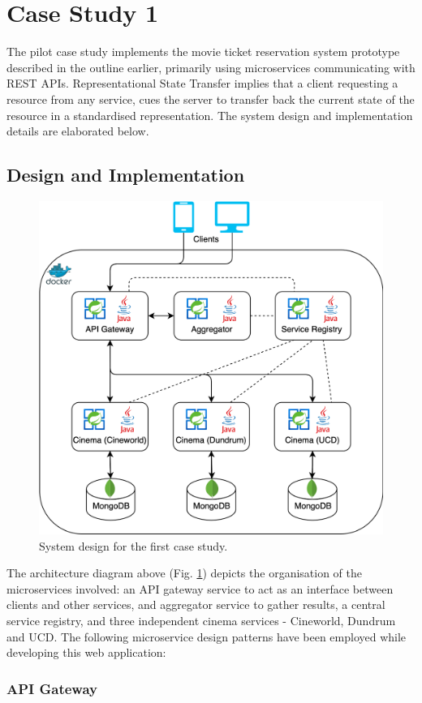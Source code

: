 \section{Case Study 1}

The pilot case study implements the movie ticket reservation system prototype described in the outline earlier, primarily using microservices communicating with REST APIs. Representational State Transfer implies that a client requesting a resource from any service, cues the server to transfer back the current state of the resource in a standardised representation. The system design and implementation details are elaborated below.

\subsection{Design and Implementation}

\begin{figure}[H]
  \centering
  \includegraphics[width=0.6\linewidth]{./assets/diagrams/cs01-arch.png}
  \caption{System design for the first case study.}
  \label{fig:cs01-arch}
\end{figure}

The architecture diagram above (Fig. \ref{fig:cs01-arch}) depicts the organisation of the microservices involved: an API gateway service to act as an interface between clients and other services, and aggregator service to gather results, a central service registry, and three independent cinema services - Cineworld, Dundrum and UCD. The following microservice design patterns have been employed while developing this web application:

\subsubsection{API Gateway}

